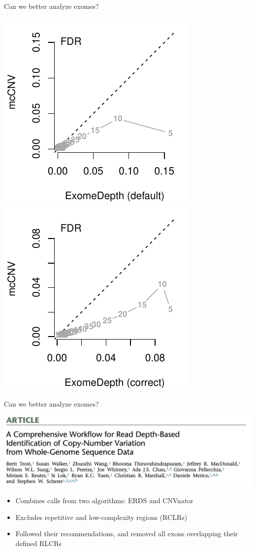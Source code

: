\documentclass[
  10pt,
  ignorenonframetext,
  m]{beamer}
\begin{document}
\begin{frame}{Can we better analyze exomes?}
\protect\hypertarget{can-we-better-analyze-exomes-3}{}

\begin{center}\includegraphics[width=0.49\linewidth]{defense_files/figure-beamer/simResFDR-1} \includegraphics[width=0.49\linewidth]{defense_files/figure-beamer/simResFDR-2} \end{center}

\end{frame}

\begin{frame}{Can we better analyze exomes?}
\protect\hypertarget{can-we-better-analyze-exomes-4}{}

\centering

\includegraphics{images/trost.png} \raggedright

\begin{itemize}
\item
  Combines calls from two algorithms: ERDS and CNVnator
\item
  Excludes repetitive and low-complexity regions (RCLRs)
\item
  Followed their recommendations, and removed all exons overlapping
  their defined RLCRs
\end{itemize}

\end{frame}
\end{document}
